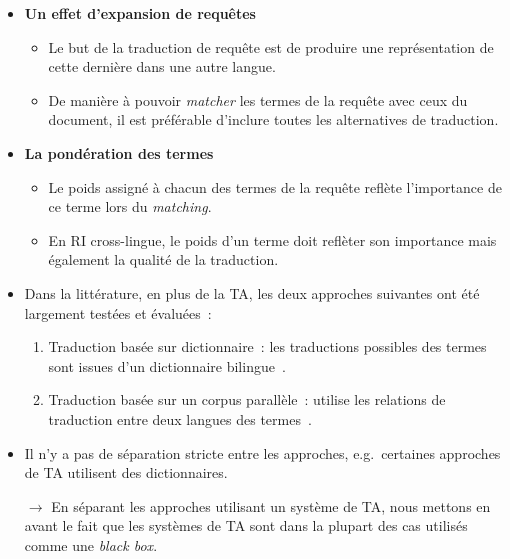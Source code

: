 \documentclass[11pt,aspectratio=43,dvipsnames,table]{beamer}
\begin{document}
\begin{frame}[allowframebreaks]
\begin{itemize}
        \framebreak

        \item \textbf{Un effet d'expansion de requêtes}
        \begin{itemize}
            \item Le but de la traduction de requête est de produire une 
                  représentation de cette dernière dans une autre langue.
            \item De manière à pouvoir \textit{matcher} les termes de la requête
                  avec ceux du document, il est préférable d'inclure toutes les
                  alternatives de traduction.
        \end{itemize}
        \item \textbf{La pondération des termes}
        \begin{itemize}
            \item Le poids assigné à chacun des termes de la requête reflète 
                  l'importance de ce terme lors du \textit{matching}.
            \item En RI cross-lingue, le poids d'un terme doit reflèter son 
                  importance mais également la qualité de la traduction.
        \end{itemize}

        \framebreak

        \item Dans la littérature, en plus de la TA, les deux approches 
              suivantes ont été largement testées et évaluées~:
        \begin{enumerate}
            \item Traduction basée sur dictionnaire~: les traductions possibles 
                  des termes sont issues d'un dictionnaire 
                  bilingue~\cite{Pirkola:2001}.
            \item Traduction basée sur un corpus parallèle~: utilise les 
                  relations de traduction entre deux langues des 
                  termes~\cite{Chen00parallelweb}.
        \end{enumerate}
        \item Il n'y a pas de séparation stricte entre les approches, 
              e.g.~certaines approches de TA utilisent des dictionnaires.
        \item[$\to$] En séparant les approches utilisant un système de TA, nous
                     mettons en avant le fait que les systèmes de TA sont dans la
                     plupart des cas utilisés comme une \textit{black box}.
    \end{itemize}
\end{frame}
\end{document}
